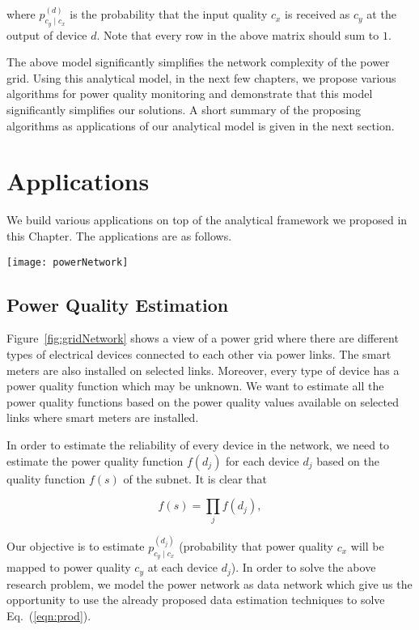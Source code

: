 \noindent
where $p_{c_y \mid c_x}^{(d)}$ is the probability that the input quality $c_x$ is received as $c_y$ at the output of device $d$. Note that every row in the above matrix should sum to $1$. 

The above model significantly simplifies the network complexity of the power grid. Using this analytical model, in the next few chapters, we propose various algorithms for power quality monitoring and demonstrate that this model significantly simplifies our solutions. A short summary of the proposing algorithms as applications of our analytical model is given in the next section.

\section{Applications}
We build various applications on top of the analytical framework we proposed in this Chapter. The applications are as follows.

\begin{figure*}[!t]
    \centering
    \texttt{[image: powerNetwork]}
    \caption{A simple view of power microgrid}
    \label{fig:gridNetwork}
\end{figure*}


\subsection{Power Quality Estimation}
Figure~\ref{fig:gridNetwork} shows a view of a power grid where there are different types of electrical devices connected to each other via power links. The smart meters are also installed on selected links. Moreover, every type of device has a power quality function which may be unknown. We want to estimate all the power quality functions based on the power quality values available on selected links where smart meters are installed.

In order to estimate the reliability of every device in the network, we need to estimate the power quality function $f(d_j)$ for each device $d_j$ based on the quality function $f(s)$ of the subnet. It is clear that

\begin{equation}
\label{eqn:prod}
f(s) = \prod_{j} f(d_j),
\end{equation}

Our objective is to estimate $p_{c_y \mid c_x}^{(d_j)}$ (probability that power quality $c_x$ will be mapped to power quality $c_y$ at each device $d_j$). In order to solve the above research problem, we model the power network as data network which give us the opportunity to use the already proposed data estimation techniques to solve Eq.~(\ref{eqn:prod}).

